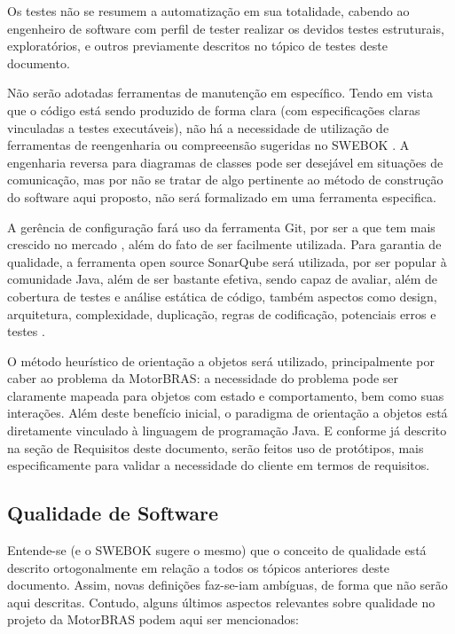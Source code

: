 \documentclass[12pt,journal,compsoc]{IEEEtran}
\begin{document}
Os testes não se resumem a automatização em sua totalidade, cabendo ao engenheiro de software com perfil de tester realizar os devidos testes estruturais, exploratórios, e outros previamente descritos no tópico de testes deste documento.

Não serão adotadas ferramentas de manutenção em específico. Tendo em vista que o código está sendo produzido de forma clara (com especificações claras vinculadas a testes executáveis), não há a necessidade de utilização de ferramentas de reengenharia ou compreeensão sugeridas no SWEBOK \cite{society_software_2004}. A engenharia reversa para diagramas de classes pode ser desejável em situações de comunicação, mas por não se tratar de algo pertinente ao método de construção do software aqui proposto, não será formalizado em uma ferramenta especifica.

A gerência de configuração fará uso da ferramenta Git, por ser a que tem mais crescido no mercado \cite{scm_ranking}, além do fato de ser facilmente utilizada. Para garantia de qualidade, a ferramenta open source SonarQube será utilizada, por ser popular à comunidade Java, além de ser bastante efetiva, sendo capaz de avaliar, além de cobertura de testes e análise estática de código, também aspectos como design, arquitetura, complexidade, duplicação, regras de codificação, potenciais erros e testes \cite{quality_java_2010}.   

O método heurístico de orientação a objetos será utilizado, principalmente por caber ao problema da MotorBRAS: a necessidade do problema pode ser claramente mapeada para objetos com estado e comportamento, bem como suas interações. Além deste benefício inicial, o paradigma de orientação a objetos está diretamente vinculado à linguagem de programação Java. E conforme já descrito na seção de Requisitos deste documento, serão feitos uso de protótipos, mais especificamente para validar a necessidade do cliente em termos de requisitos.  


\subsection{Qualidade de Software}

Entende-se (e o SWEBOK \cite{society_software_2004} sugere o mesmo) que o conceito de qualidade está descrito ortogonalmente em relação a todos os tópicos anteriores deste documento. Assim, novas de‌finições faz-se-iam ambíguas, de forma que não serão aqui descritas. Contudo, alguns últimos aspectos relevantes sobre qualidade no projeto da MotorBRAS podem aqui ser mencionados:
\end{document}

